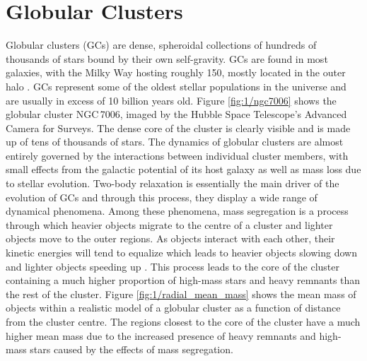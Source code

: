 
\section{Globular Clusters}


Globular clusters (GCs) are dense, spheroidal collections of hundreds of thousands of stars bound by
their own self-gravity. GCs are found in most galaxies, with the Milky Way hosting roughly 150,
mostly located in the outer halo \citep{Heggie2003}. GCs represent some of the oldest stellar
populations in the universe and are usually in excess of 10 billion years old. Figure
\ref{fig:1/ngc7006} shows the globular cluster NGC\,7006, imaged by the Hubble Space Telescope's
Advanced Camera for Surveys. The dense core of the cluster is clearly visible and is made up of tens
of thousands of stars. The dynamics of globular clusters are almost entirely governed by the
interactions between individual cluster members, with small effects from the galactic potential of
its host galaxy as well as mass loss due to stellar evolution. Two-body relaxation is essentially
the main driver of the evolution of GCs and through this process, they display a wide range of dynamical
phenomena. Among these phenomena, mass segregation is a process through which heavier objects
migrate to the centre of a cluster and lighter objects move to the outer regions. As objects
interact with each other, their kinetic energies will tend to equalize which leads to heavier
objects slowing down and lighter objects speeding up \citep{Heggie2003}. This process leads to the
core of the cluster containing a much higher proportion of high-mass stars and heavy remnants than
the rest of the cluster. Figure \ref{fig:1/radial_mean_mass} shows the mean mass of objects within a
realistic model of a globular cluster as a function of distance from the cluster centre. The regions
closest to the core of the cluster have a much higher mean mass due to the increased presence of
heavy remnants and high-mass stars caused by the effects of mass segregation.

